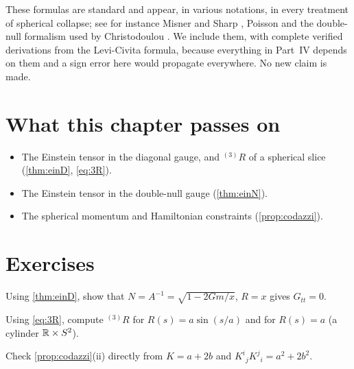 \begin{litbox}
These formulas are standard and appear, in various notations, in every treatment of spherical collapse; see for instance Misner and Sharp \cite{MisnerSharp1964}, Poisson \cite{PoissonToolkit} and the double-null formalism used by Christodoulou \cite{Christodoulou1993}. We include them, with complete verified derivations from the Levi-Civita formula, because everything in Part~IV depends on them and a sign error here would propagate everywhere. No new claim is made.
\end{litbox}

\section*{What this chapter passes on}
\begin{itemize}[nosep]
\item The Einstein tensor in the diagonal gauge, and ${}^{(3)}R$ of a spherical slice (\cref{thm:einD}, \eqref{eq:3R}).
\item The Einstein tensor in the double-null gauge (\cref{thm:einN}).
\item The spherical momentum and Hamiltonian constraints (\cref{prop:codazzi}).
\end{itemize}

\section*{Exercises}
\begin{exercise}
Using \cref{thm:einD}, show that $N=A^{-1}=\sqrt{1-2Gm/x}$, $R=x$ gives $G_{tt}=0$.
\end{exercise}
\begin{exercise}
Using \eqref{eq:3R}, compute ${}^{(3)}R$ for $R(s)=a\sin(s/a)$ and for $R(s)=a$ (a cylinder $\mathbb{R}\times S^2$).
\end{exercise}
\begin{exercise}
Check \cref{prop:codazzi}(ii) directly from $K=a+2b$ and $K^i{}_jK^j{}_i=a^2+2b^2$.
\end{exercise}

